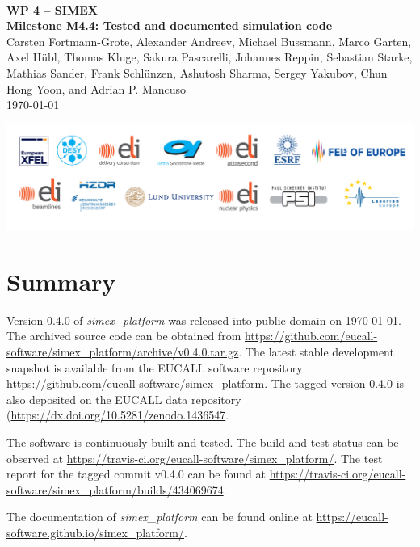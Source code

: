 \documentclass[10pt]{scrartcl}
\begin{document}
\makeatletter
\begin{titlepage}
\thispagestyle{scrheadings}
\begin{center}
  $~$\\
  \vspace{2cm}
  \Huge{\textbf{WP 4 -- SIMEX\\[1cm]
    Milestone M4.4: Tested and documented simulation code%
  }}\\
  \vspace{2cm}
  \large{%
    Carsten Fortmann-Grote,
    Alexander Andreev,
    Michael Bussmann,
    Marco Garten,
    Axel H\"ubl,
    Thomas Kluge,
    Sakura Pascarelli,
    Johannes Reppin,
    Sebastian Starke,
    Mathias Sander,
    Frank Schl\"unzen,
    Ashutosh Sharma,
    Sergey Yakubov,
    Chun Hong Yoon,
    and
    Adrian P. Mancuso\\[4ex]
  }
  \today
\end{center}
\vfill%
\includegraphics[width=\textwidth]{figures/PartnerLogos_2017}
\end{titlepage}
\makeatother


\section{Summary}
%
Version 0.4.0 of \textit{simex\_platform} was released into public domain on
\today. The archived source code can be obtained from
\url{https://github.com/eucall-software/simex_platform/archive/v0.4.0.tar.gz}.
The latest stable development snapshot is available from the EUCALL software repository
\url{https://github.com/eucall-software/simex_platform}.
The tagged version 0.4.0 is also deposited on the EUCALL data repository
(\url{https://dx.doi.org/10.5281/zenodo.1436547}.

The software is continuously built and tested. The build and test status can be
observed at \url{https://travis-ci.org/eucall-software/simex_platform/}. The
test report for the tagged commit v0.4.0 can be found at
\url{https://travis-ci.org/eucall-software/simex_platform/builds/434069674}.

The documentation of \textit{simex\_platform} can be found online at
\url{https://eucall-software.github.io/simex_platform/}.

\end{document}
